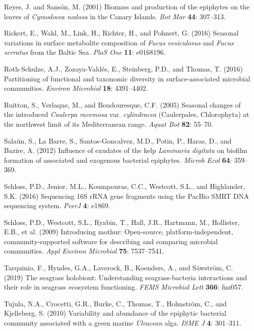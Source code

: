 \documentclass[12pt,]{article}
\begin{document}
\leavevmode\hypertarget{ref-Reyes2001}{}%
Reyes, J. and Sansón, M. (2001) Biomass and production of the epiphytes
on the leaves of \emph{Cymodocea nodosa} in the Canary Islands.
\emph{Bot Mar} \textbf{44}: 307--313.

\leavevmode\hypertarget{ref-Rickert2016}{}%
Rickert, E., Wahl, M., Link, H., Richter, H., and Pohnert, G. (2016)
Seasonal variations in surface metabolite composition of \emph{Fucus
vesiculosus} and \emph{Fucus serratus} from the Baltic Sea. \emph{PloS
One} \textbf{11}: e0168196.

\leavevmode\hypertarget{ref-Roth-Schulze2016}{}%
Roth-Schulze, A.J., Zozaya-Valdés, E., Steinberg, P.D., and Thomas, T.
(2016) Partitioning of functional and taxonomic diversity in
surface-associated microbial communities. \emph{Environ Microbiol}
\textbf{18}: 4391--4402.

\leavevmode\hypertarget{ref-Ruitton2005}{}%
Ruitton, S., Verlaque, M., and Boudouresque, C.F. (2005) Seasonal
changes of the introduced \emph{Caulerpa racemosa} var.
\emph{cylindracea} (Caulerpales, Chlorophyta) at the northwest limit of
its Mediterranean range. \emph{Aquat Bot} \textbf{82}: 55--70.

\leavevmode\hypertarget{ref-Salaun2012}{}%
Salaün, S., La Barre, S., Santos-Goncalvez, M.D., Potin, P., Haras, D.,
and Bazire, A. (2012) Influence of exudates of the kelp \emph{Laminaria
digitata} on biofilm formation of associated and exogenous bacterial
epiphytes. \emph{Microb Ecol} \textbf{64}: 359--369.

\leavevmode\hypertarget{ref-Schloss2016}{}%
Schloss, P.D., Jenior, M.L., Koumpouras, C.C., Westcott, S.L., and
Highlander, S.K. (2016) Sequencing 16S rRNA gene fragments using the
PacBio SMRT DNA sequencing system. \emph{PeerJ} \textbf{4}: e1869.

\leavevmode\hypertarget{ref-Schloss2009}{}%
Schloss, P.D., Westcott, S.L., Ryabin, T., Hall, J.R., Hartmann, M.,
Hollister, E.B., et al. (2009) Introducing mothur: Open-source,
platform-independent, community-supported software for describing and
comparing microbial communities. \emph{Appl Environ Microbiol}
\textbf{75}: 7537--7541.

\leavevmode\hypertarget{ref-Tarquinio2019}{}%
Tarquinio, F., Hyndes, G.A., Laverock, B., Koenders, A., and Säwström,
C. (2019) The seagrass holobiont: Understanding seagrass-bacteria
interactions and their role in seagrass ecosystem functioning.
\emph{FEMS Microbiol Lett} \textbf{366}: fnz057.

\leavevmode\hypertarget{ref-Tujula2010}{}%
Tujula, N.A., Crocetti, G.R., Burke, C., Thomas, T., Holmström, C., and
Kjelleberg, S. (2010) Variability and abundance of the epiphytic
bacterial community associated with a green marine \emph{Ulvacean} alga.
\emph{ISME J} \textbf{4}: 301--311.
\end{document}
